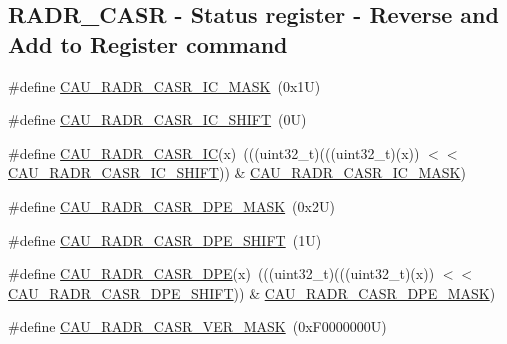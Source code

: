 \subsection*{R\+A\+D\+R\+\_\+\+C\+A\+SR -\/ Status register -\/ Reverse and Add to Register command}
\begin{DoxyCompactItemize}
\item 
\#define \mbox{\hyperlink{group___c_a_u___register___masks_ga8b83182cdf0c23dd0359bdd4bde2e770}{C\+A\+U\+\_\+\+R\+A\+D\+R\+\_\+\+C\+A\+S\+R\+\_\+\+I\+C\+\_\+\+M\+A\+SK}}~(0x1\+U)
\item 
\#define \mbox{\hyperlink{group___c_a_u___register___masks_gaaaed76b153aa3db1dd33853bd41f890f}{C\+A\+U\+\_\+\+R\+A\+D\+R\+\_\+\+C\+A\+S\+R\+\_\+\+I\+C\+\_\+\+S\+H\+I\+FT}}~(0\+U)
\item 
\#define \mbox{\hyperlink{group___c_a_u___register___masks_gaab87c3c012fc919f5cb6c72fca21c738}{C\+A\+U\+\_\+\+R\+A\+D\+R\+\_\+\+C\+A\+S\+R\+\_\+\+IC}}(x)~(((uint32\+\_\+t)(((uint32\+\_\+t)(x)) $<$$<$ \mbox{\hyperlink{group___c_a_u___register___masks_gaaaed76b153aa3db1dd33853bd41f890f}{C\+A\+U\+\_\+\+R\+A\+D\+R\+\_\+\+C\+A\+S\+R\+\_\+\+I\+C\+\_\+\+S\+H\+I\+FT}})) \& \mbox{\hyperlink{group___c_a_u___register___masks_ga8b83182cdf0c23dd0359bdd4bde2e770}{C\+A\+U\+\_\+\+R\+A\+D\+R\+\_\+\+C\+A\+S\+R\+\_\+\+I\+C\+\_\+\+M\+A\+SK}})
\item 
\#define \mbox{\hyperlink{group___c_a_u___register___masks_gae77a40261939bae263003192796104ac}{C\+A\+U\+\_\+\+R\+A\+D\+R\+\_\+\+C\+A\+S\+R\+\_\+\+D\+P\+E\+\_\+\+M\+A\+SK}}~(0x2\+U)
\item 
\#define \mbox{\hyperlink{group___c_a_u___register___masks_ga29f9fdde7f5d91e78a00e02dc66d90ce}{C\+A\+U\+\_\+\+R\+A\+D\+R\+\_\+\+C\+A\+S\+R\+\_\+\+D\+P\+E\+\_\+\+S\+H\+I\+FT}}~(1\+U)
\item 
\#define \mbox{\hyperlink{group___c_a_u___register___masks_gac7feaf137fc4cabaf41fcf02ffcdcb0f}{C\+A\+U\+\_\+\+R\+A\+D\+R\+\_\+\+C\+A\+S\+R\+\_\+\+D\+PE}}(x)~(((uint32\+\_\+t)(((uint32\+\_\+t)(x)) $<$$<$ \mbox{\hyperlink{group___c_a_u___register___masks_ga29f9fdde7f5d91e78a00e02dc66d90ce}{C\+A\+U\+\_\+\+R\+A\+D\+R\+\_\+\+C\+A\+S\+R\+\_\+\+D\+P\+E\+\_\+\+S\+H\+I\+FT}})) \& \mbox{\hyperlink{group___c_a_u___register___masks_gae77a40261939bae263003192796104ac}{C\+A\+U\+\_\+\+R\+A\+D\+R\+\_\+\+C\+A\+S\+R\+\_\+\+D\+P\+E\+\_\+\+M\+A\+SK}})
\item 
\#define \mbox{\hyperlink{group___c_a_u___register___masks_ga93d73e487a9f7e0f78ff89b8c2162099}{C\+A\+U\+\_\+\+R\+A\+D\+R\+\_\+\+C\+A\+S\+R\+\_\+\+V\+E\+R\+\_\+\+M\+A\+SK}}~(0x\+F0000000\+U)

\end{DoxyCompactItemize}
